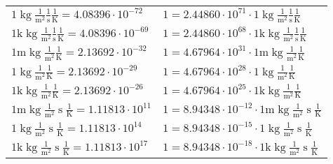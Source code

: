 \begin{center}
\begin{longtable}{l l}
{\color{black}$1 \bm{\mathrm{ }}\operatorname{kg}\frac1{\operatorname{m}^2}\frac1{\operatorname{s}}{}\frac1{\operatorname{K}} = 4.08396\cdot10^{-72} $}   & {\color{black}$ 1 = 2.44860\cdot10^{71} \cdot 1 \bm{\mathrm{ }}\operatorname{kg}\frac1{\operatorname{m}^2}\frac1{\operatorname{s}}{}\frac1{\operatorname{K}}$}  \\
{\color{gray}$1 \bm{\mathrm{ k}}\operatorname{kg}\frac1{\operatorname{m}^2}\frac1{\operatorname{s}}{}\frac1{\operatorname{K}} = 4.08396\cdot10^{-69} $}   & {\color{gray}$ 1 = 2.44860\cdot10^{68} \cdot 1 \bm{\mathrm{ k}}\operatorname{kg}\frac1{\operatorname{m}^2}\frac1{\operatorname{s}}{}\frac1{\operatorname{K}}$}  \\
{\color{gray}$1 \bm{\mathrm{ m}}\operatorname{kg}\frac1{\operatorname{m}^2}{}{}\frac1{\operatorname{K}} = 2.13692\cdot10^{-32} $}   & {\color{gray}$ 1 = 4.67964\cdot10^{31} \cdot 1 \bm{\mathrm{ m}}\operatorname{kg}\frac1{\operatorname{m}^2}{}{}\frac1{\operatorname{K}}$}  \\
{\color{black}$1 \bm{\mathrm{ }}\operatorname{kg}\frac1{\operatorname{m}^2}{}{}\frac1{\operatorname{K}} = 2.13692\cdot10^{-29} $}   & {\color{black}$ 1 = 4.67964\cdot10^{28} \cdot 1 \bm{\mathrm{ }}\operatorname{kg}\frac1{\operatorname{m}^2}{}{}\frac1{\operatorname{K}}$}  \\
{\color{gray}$1 \bm{\mathrm{ k}}\operatorname{kg}\frac1{\operatorname{m}^2}{}{}\frac1{\operatorname{K}} = 2.13692\cdot10^{-26} $}   & {\color{gray}$ 1 = 4.67964\cdot10^{25} \cdot 1 \bm{\mathrm{ k}}\operatorname{kg}\frac1{\operatorname{m}^2}{}{}\frac1{\operatorname{K}}$}  \\
{\color{gray}$1 \bm{\mathrm{ m}}\operatorname{kg}\frac1{\operatorname{m}^2}{\operatorname{s}}{}\frac1{\operatorname{K}} = 1.11813\cdot10^{11} $}   & {\color{gray}$ 1 = 8.94348\cdot10^{-12} \cdot 1 \bm{\mathrm{ m}}\operatorname{kg}\frac1{\operatorname{m}^2}{\operatorname{s}}{}\frac1{\operatorname{K}}$}  \\
{\color{black}$1 \bm{\mathrm{ }}\operatorname{kg}\frac1{\operatorname{m}^2}{\operatorname{s}}{}\frac1{\operatorname{K}} = 1.11813\cdot10^{14} $}   & {\color{black}$ 1 = 8.94348\cdot10^{-15} \cdot 1 \bm{\mathrm{ }}\operatorname{kg}\frac1{\operatorname{m}^2}{\operatorname{s}}{}\frac1{\operatorname{K}}$}  \\
{\color{gray}$1 \bm{\mathrm{ k}}\operatorname{kg}\frac1{\operatorname{m}^2}{\operatorname{s}}{}\frac1{\operatorname{K}} = 1.11813\cdot10^{17} $}   & {\color{gray}$ 1 = 8.94348\cdot10^{-18} \cdot 1 \bm{\mathrm{ k}}\operatorname{kg}\frac1{\operatorname{m}^2}{\operatorname{s}}{}\frac1{\operatorname{K}}$}  \\

\end{longtable}
\end{center}
